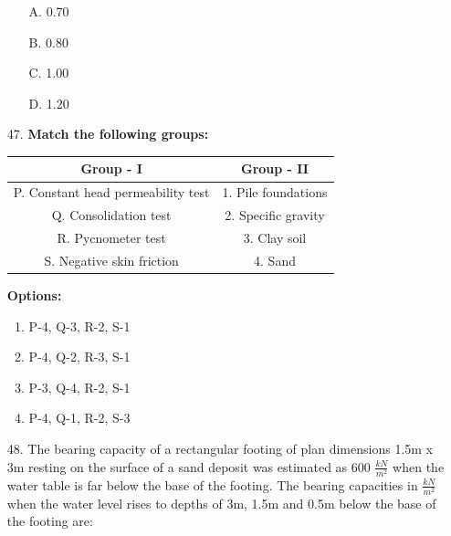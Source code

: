 \documentclass[journal]{IEEEtran}
\begin{document}
\begin{enumerate}
\begin{figure}[!ht]
    \label{fig:my_label4}
    \end{figure}
  \begin{enumerate}
    \item [A.] 0.70
    \item [B.] 0.80
    \item [C.] 1.00
    \item [D.] 1.20
  \end{enumerate} 
  \item [47.] \textbf{Match the following groups:}

  \begin{center}
  \begin{tabular}{|c c|}
  \hline
  \textbf{Group - I} & \textbf{Group - II} \\
  \hline
  P. Constant head permeability test & 1. Pile foundations \\
  Q. Consolidation test               & 2. Specific gravity \\
  R. Pycnometer test                  & 3. Clay soil \\
  S. Negative skin friction            & 4. Sand \\
  \hline
  \end{tabular}
  \end{center}
  
  \textbf{Options:}
  
  \begin{enumerate}[label=\Alph*]
      \item P-4, Q-3, R-2, S-1
      \item P-4, Q-2, R-3, S-1
      \item P-3, Q-4, R-2, S-1
      \item P-4, Q-1, R-2, S-3
  \end{enumerate}
  \item [48.] The bearing capacity of a rectangular footing of plan dimensions 1.5m x 3m resting on the surface of a sand deposit was estimated as 600 $\frac{kN}{m^2}$ when the water table is far below the base of the footing. The bearing capacities in $\frac{kN}{m^2}$ when the water level rises to depths of 3m, 1.5m and 0.5m below the base of the footing are:


\end{enumerate}
\end{document}
